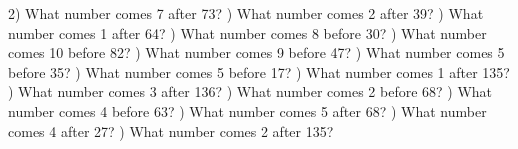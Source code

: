 \documentclass{article}%
\begin{document}
2) What number comes 7 after 73?%
\newline%
\newline%
) What number comes 2 after 39?%
\newline%
\newline%
) What number comes 1 after 64?%
\newline%
\newline%
) What number comes 8 before 30?%
\newline%
\newline%
) What number comes 10 before 82?%
\newline%
\newline%
) What number comes 9 before 47?%
\newline%
\newline%
) What number comes 5 before 35?%
\newline%
\newline%
) What number comes 5 before 17?%
\newline%
\newline%
) What number comes 1 after 135?%
\newline%
\newline%
) What number comes 3 after 136?%
\newline%
\newline%
) What number comes 2 before 68?%
\newline%
\newline%
) What number comes 4 before 63?%
\newline%
\newline%
) What number comes 5 after 68?%
\newline%
\newline%
) What number comes 4 after 27?%
\newline%
\newline%
) What number comes 2 after 135?%
\end{document}

